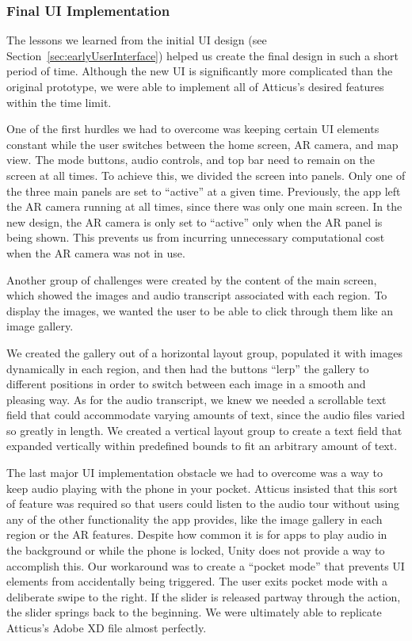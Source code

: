 \documentclass[a4paper, 10pt, american, titlepage]{article}
\begin{document}
\subsubsection{Final UI Implementation}
\label{sec:finalUI}

The lessons we learned from the initial UI design (see
Section~\ref{sec:earlyUserInterface}) helped us create the final design in such
a short period of time. Although the new UI is significantly more complicated
than the original prototype, we were able to implement all of Atticus's desired
features within the time limit.

One of the first hurdles we had to overcome was keeping certain UI elements
constant while the user switches between the home screen, AR camera, and map
view. The mode buttons, audio controls, and top bar need to remain on the screen
at all times. To achieve this, we divided the screen into panels. Only one of
the three main panels are set to ``active'' at a given time. Previously, the app
left the AR camera running at all times, since there was only one main screen.
In the new design, the AR camera is only set to ``active'' only when the AR
panel is being shown. This prevents us from incurring unnecessary computational
cost when the AR camera was not in use.

Another group of challenges were created by the content of the main screen,
which showed the images and audio transcript associated with each region. To
display the images, we wanted the user to be able to click through them like
an image gallery.

We created the gallery out of a horizontal layout group, populated it with
images dynamically in each region, and then had the buttons ``lerp'' the gallery
to different positions in order to switch between each image in a smooth and
pleasing way. As for the audio transcript, we knew we needed a scrollable text
field that could accommodate varying amounts of text, since the audio files
varied so greatly in length. We created a vertical layout group to create a text
field that expanded vertically within predefined bounds to fit an arbitrary
amount of text.

The last major UI implementation obstacle we had to overcome was a way to keep
audio playing with the phone in your pocket. Atticus insisted that this sort of
feature was required so that users could listen to the audio tour without using %
any of the other functionality the app provides, like the image gallery in each
region or the AR features. Despite how common it is for apps to play audio in
the background or while the phone is locked, Unity does not provide a way to
accomplish this. Our workaround was to create a ``pocket mode'' that prevents UI
elements from accidentally being triggered. The user exits pocket mode with a
deliberate swipe to the right. If the slider is released partway through the
action, the slider springs back to the beginning. We were ultimately able to
replicate Atticus's Adobe XD file almost perfectly.
\end{document}
